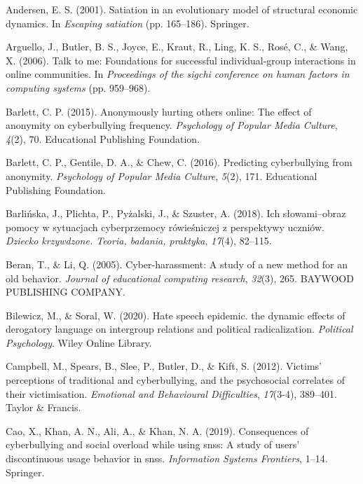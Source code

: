 \documentclass[10pt,dvipsnames]{scrartcl}
\begin{document}
\hypertarget{ref-andersen2001satiation}{}
Andersen, E. S. (2001). Satiation in an evolutionary model of structural
economic dynamics. In \emph{Escaping satiation} (pp. 165--186).
Springer.

\hypertarget{ref-arguello2006talk}{}
Arguello, J., Butler, B. S., Joyce, E., Kraut, R., Ling, K. S., Rosé,
C., \& Wang, X. (2006). Talk to me: Foundations for successful
individual-group interactions in online communities. In
\emph{Proceedings of the sigchi conference on human factors in computing
systems} (pp. 959--968).

\hypertarget{ref-barlett2015anonymously}{}
Barlett, C. P. (2015). Anonymously hurting others online: The effect of
anonymity on cyberbullying frequency. \emph{Psychology of Popular Media
Culture}, \emph{4}(2), 70. Educational Publishing Foundation.

\hypertarget{ref-barlett2016predicting}{}
Barlett, C. P., Gentile, D. A., \& Chew, C. (2016). Predicting
cyberbullying from anonymity. \emph{Psychology of Popular Media
Culture}, \emph{5}(2), 171. Educational Publishing Foundation.

\hypertarget{ref-barlinska2018slowami}{}
Barlińska, J., Plichta, P., Pyżalski, J., \& Szuster, A. (2018). Ich
słowami--obraz pomocy w sytuacjach cyberprzemocy rówieśniczej z
perspektywy uczniów. \emph{Dziecko krzywdzone. Teoria, badania,
praktyka}, \emph{17}(4), 82--115.

\hypertarget{ref-beran2005cyber}{}
Beran, T., \& Li, Q. (2005). Cyber-harassment: A study of a new method
for an old behavior. \emph{Journal of educational computing research},
\emph{32}(3), 265. BAYWOOD PUBLISHING COMPANY.

\hypertarget{ref-bilewicz2020hate}{}
Bilewicz, M., \& Soral, W. (2020). Hate speech epidemic. the dynamic
effects of derogatory language on intergroup relations and political
radicalization. \emph{Political Psychology}. Wiley Online Library.

\hypertarget{ref-campbell2012victims}{}
Campbell, M., Spears, B., Slee, P., Butler, D., \& Kift, S. (2012).
Victims' perceptions of traditional and cyberbullying, and the
psychosocial correlates of their victimisation. \emph{Emotional and
Behavioural Difficulties}, \emph{17}(3-4), 389--401. Taylor \& Francis.

\hypertarget{ref-cao2019consequences}{}
Cao, X., Khan, A. N., Ali, A., \& Khan, N. A. (2019). Consequences of
cyberbullying and social overload while using snss: A study of users'
discontinuous usage behavior in snss. \emph{Information Systems
Frontiers}, 1--14. Springer.
\end{document}
